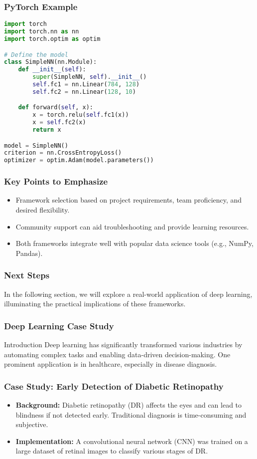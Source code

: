 \documentclass[aspectratio=169]{beamer}
\begin{document}
\begin{frame}[fragile]
    \frametitle{PyTorch Example}
    \begin{lstlisting}[language=Python]
import torch
import torch.nn as nn
import torch.optim as optim

# Define the model
class SimpleNN(nn.Module):
    def __init__(self):
        super(SimpleNN, self).__init__()
        self.fc1 = nn.Linear(784, 128)
        self.fc2 = nn.Linear(128, 10)

    def forward(self, x):
        x = torch.relu(self.fc1(x))
        x = self.fc2(x)
        return x

model = SimpleNN()
criterion = nn.CrossEntropyLoss()
optimizer = optim.Adam(model.parameters())
    \end{lstlisting}
\end{frame}

\begin{frame}
    \frametitle{Key Points to Emphasize}
    \begin{itemize}
        \item Framework selection based on project requirements, team proficiency, and desired flexibility.
        \item Community support can aid troubleshooting and provide learning resources.
        \item Both frameworks integrate well with popular data science tools (e.g., NumPy, Pandas).
    \end{itemize}
\end{frame}

\begin{frame}
    \frametitle{Next Steps}
    In the following section, we will explore a real-world application of deep learning, illuminating the practical implications of these frameworks.
\end{frame}

\begin{frame}
    \frametitle{Deep Learning Case Study}
    \begin{block}{Introduction}
        Deep learning has significantly transformed various industries by automating complex tasks and enabling data-driven decision-making. One prominent application is in healthcare, especially in disease diagnosis.
    \end{block}
\end{frame}

\begin{frame}
    \frametitle{Case Study: Early Detection of Diabetic Retinopathy}
    \begin{itemize}
        \item \textbf{Background:} 
        Diabetic retinopathy (DR) affects the eyes and can lead to blindness if not detected early. Traditional diagnosis is time-consuming and subjective.
        
        \item \textbf{Implementation:} 
        A convolutional neural network (CNN) was trained on a large dataset of retinal images to classify various stages of DR.
    \end{itemize}
\end{frame}
\end{document}
